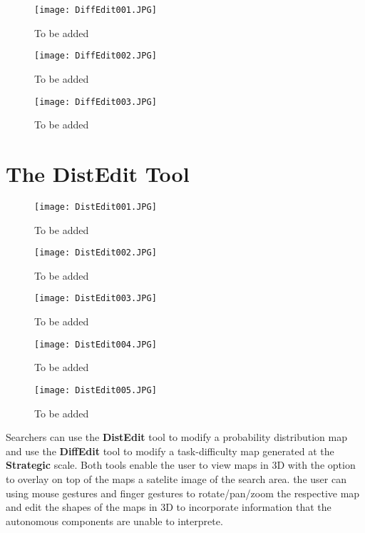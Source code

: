 \begin{figure}
\centering
\texttt{[image: DiffEdit001.JPG]}
\caption{To be added}
\label{DiffEdit001}
\end{figure}

\begin{figure}
\centering
\texttt{[image: DiffEdit002.JPG]}
\caption{To be added}
\label{DiffEdit002}
\end{figure}

\begin{figure}
\centering
\texttt{[image: DiffEdit003.JPG]}
\caption{To be added}
\label{DiffEdit003}
\end{figure}


\section{The DistEdit Tool}


\begin{figure}
\centering
\texttt{[image: DistEdit001.JPG]}
\caption{To be added}
\label{DistEdit001}
\end{figure}

\begin{figure}
\centering
\texttt{[image: DistEdit002.JPG]}
\caption{To be added}
\label{DistEdit002}
\end{figure}

\begin{figure}
\centering
\texttt{[image: DistEdit003.JPG]}
\caption{To be added}
\label{DistEdit003}
\end{figure}

\begin{figure}
\centering
\texttt{[image: DistEdit004.JPG]}
\caption{To be added}
\label{DistEdit004}
\end{figure}

\begin{figure}
\centering
\texttt{[image: DistEdit005.JPG]}
\caption{To be added}
\label{DistEdit005}
\end{figure}


Searchers can use the \textbf{DistEdit} tool to modify a probability distribution map and use the \textbf{DiffEdit} tool to modify a task-difficulty map generated at the \textbf{Strategic} scale. Both tools enable the user to view maps in 3D with the option to overlay on top of the maps a satelite image of the search area. the user can using mouse gestures and finger gestures to rotate/pan/zoom the respective map and edit the shapes of the maps in 3D to incorporate information that the autonomous components are unable to interprete. 

